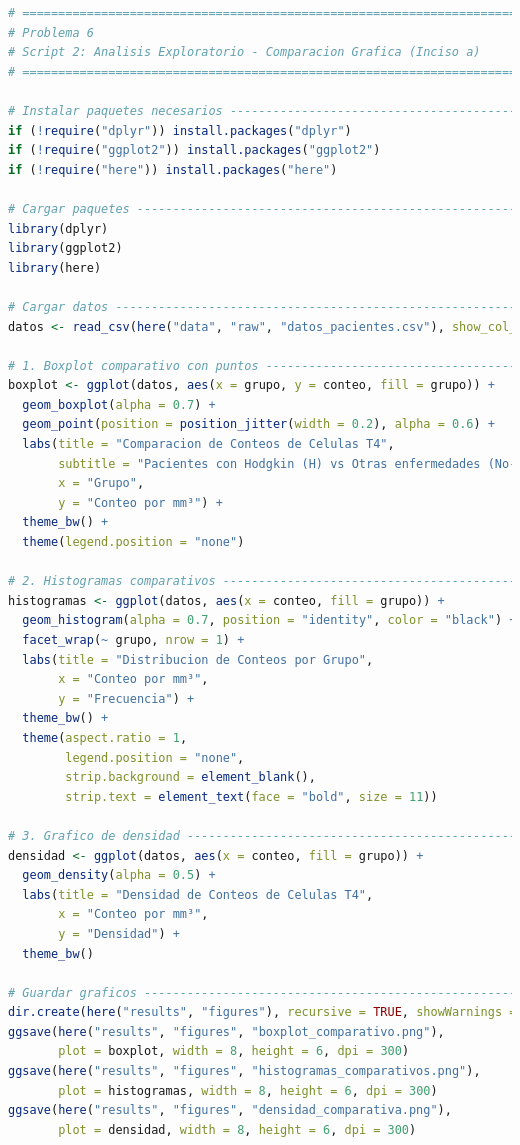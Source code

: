 \clearpage 

\begin{lstlisting}[language=R, caption={Script 2: Analisis Exploratorio - Comparacion Grafica (Inciso a).}, label={lst:script3}]
# =============================================================================
# Problema 6
# Script 2: Analisis Exploratorio - Comparacion Grafica (Inciso a)
# =============================================================================

# Instalar paquetes necesarios ------------------------------------------------
if (!require("dplyr")) install.packages("dplyr")
if (!require("ggplot2")) install.packages("ggplot2")
if (!require("here")) install.packages("here")

# Cargar paquetes -------------------------------------------------------------
library(dplyr)
library(ggplot2)
library(here)

# Cargar datos ----------------------------------------------------------------
datos <- read_csv(here("data", "raw", "datos_pacientes.csv"), show_col_types = FALSE)

# 1. Boxplot comparativo con puntos -------------------------------------------
boxplot <- ggplot(datos, aes(x = grupo, y = conteo, fill = grupo)) +
  geom_boxplot(alpha = 0.7) +
  geom_point(position = position_jitter(width = 0.2), alpha = 0.6) +
  labs(title = "Comparacion de Conteos de Celulas T4",
       subtitle = "Pacientes con Hodgkin (H) vs Otras enfermedades (No-H)",
       x = "Grupo",
       y = "Conteo por mm³") +
  theme_bw() +
  theme(legend.position = "none")

# 2. Histogramas comparativos -------------------------------------------------
histogramas <- ggplot(datos, aes(x = conteo, fill = grupo)) +
  geom_histogram(alpha = 0.7, position = "identity", color = "black") +
  facet_wrap(~ grupo, nrow = 1) +  
  labs(title = "Distribucion de Conteos por Grupo",
       x = "Conteo por mm³",
       y = "Frecuencia") +
  theme_bw() +
  theme(aspect.ratio = 1,
        legend.position = "none",
        strip.background = element_blank(),  
        strip.text = element_text(face = "bold", size = 11)) 

# 3. Grafico de densidad ------------------------------------------------------
densidad <- ggplot(datos, aes(x = conteo, fill = grupo)) +
  geom_density(alpha = 0.5) +
  labs(title = "Densidad de Conteos de Celulas T4",
       x = "Conteo por mm³",
       y = "Densidad") +
  theme_bw()

# Guardar graficos ------------------------------------------------------------
dir.create(here("results", "figures"), recursive = TRUE, showWarnings = FALSE)
ggsave(here("results", "figures", "boxplot_comparativo.png"), 
       plot = boxplot, width = 8, height = 6, dpi = 300)
ggsave(here("results", "figures", "histogramas_comparativos.png"), 
       plot = histogramas, width = 8, height = 6, dpi = 300)
ggsave(here("results", "figures", "densidad_comparativa.png"), 
       plot = densidad, width = 8, height = 6, dpi = 300)


\end{lstlisting}
